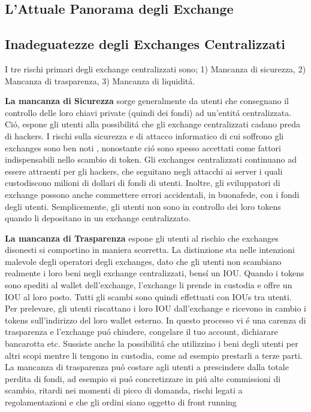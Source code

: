 \documentclass[UTF8,nofonts]{article}
\begin{document}
\begin{multicols}{2}
\section{L'Attuale Panorama degli Exchange\label{sec:current_exchange_landscape}}

\subsection{Inadeguatezze degli Exchanges Centralizzati}
I tre rischi primari degli exchange centralizzati sono;	1) Mancanza di sicurezza, 2) Mancanza di trasparenza, 3) Mancanza di liquidit\'a.

\textbf{La mancanza di Sicurezza} sorge generalmente da utenti che consegnano il controllo delle loro chiavi private (quindi dei fondi) ad un'entit\'a centralizzata. Ci\'o, espone gli utenti alla possibilit\'a che gli exchange centralizzati cadano preda di hackers. I rischi sulla sicurezza e di attacco informatico di cui soffrono gli exchanges sono ben noti\cite{coincheckhack}  \cite{mcmillan2014inside}, nonostante ci\'o sono spesso accettati come fattori indispensabili nello scambio di token.  Gli exchanges centralizzati continuano ad essere attraenti per gli hackers, che seguitano negli attacchi ai server i quali custodiscono milioni di dollari di fondi di utenti. Inoltre, gli sviluppatori di exchange possono anche commettere errori accidentali, in buonafede, con i fondi degli utenti. Semplicemente, gli utenti non sono in controllo dei loro tokens quando li depositano in un exchange centralizzato.

\textbf{La mancanza di Trasparenza} espone gli utenti al rischio che exchanges disonesti si comportino in maniera scorretta. La distinzione sta nelle intenzioni malevole degli operatori degli exchanges, dato che gli utenti non scambiano realmente i loro beni negli exchange centralizzati, bens\'i un IOU. Quando i tokens sono spediti al wallet dell'exchange, l'exchange li prende in custodia e offre un IOU al loro posto. Tutti gli scambi sono quindi effettuati con IOUs tra utenti. Per prelevare, gli utenti riscattano i loro IOU dall'exchange e ricevono in cambio i tokens sull'indirizzo del loro wallet esterno. In questo processo vi \'e una carenza di trasparenza e l'exchange pu\'o chiudere, congelare il tuo account, dichiarare bancarotta etc. Sussiste anche la possibilit\'a che utilizzino i beni degli utenti per altri scopi mentre li tengono in custodia, come ad esempio prestarli a terze parti. La mancanza di trasparenza pu\'o costare agli utenti a prescindere dalla totale perdita di fondi, ad esempio si pu\'o concretizzare in pi\'u alte commissioni di scambio, ritardi nei momenti di picco di domanda, rischi legati a regolamentazioni e che gli ordini siano oggetto di front running


\end{multicols}
\end{document}
